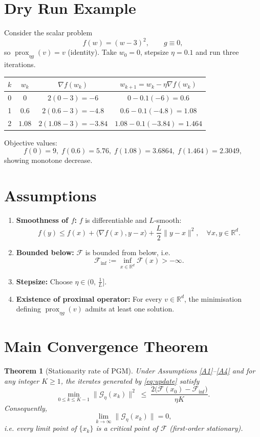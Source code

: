 \documentclass{article}
\newtheorem{theorem}{Theorem}
\newcommand{\prox}{\operatorname{prox}}
\newcommand{\grad}{\nabla}
\newcommand{\R}{\mathbb{R}}
\newcommand{\G}{\mathcal{G}}
\newcommand{\F}{\mathcal{F}}
\begin{document}
\section*{Dry Run Example}
Consider the scalar problem  
\[
f(w)=(w-3)^{2},\qquad g\equiv0,
\]
so $\prox_{\eta g}(v)=v$ (identity).  
Take $w_{0}=0$, stepsize $\eta=0.1$ and run three iterations.

\begin{center}
\begin{tabular}{c|c|c|c}
$k$ & $w_{k}$ & $\grad f(w_{k})$ & $w_{k+1}=w_{k}-\eta\grad f(w_{k})$ \\ \hline
0 & $0$ & $2(0-3)=-6$ & $0-0.1(-6)=0.6$ \\
1 & $0.6$ & $2(0.6-3)=-4.8$ & $0.6-0.1(-4.8)=1.08$ \\
2 & $1.08$ & $2(1.08-3)=-3.84$ & $1.08-0.1(-3.84)=1.464$ \\
\end{tabular}
\end{center}

Objective values:
\[
f(0)=9,\; f(0.6)=5.76,\; f(1.08)=3.6864,\; f(1.464)=2.3049,
\]
showing monotone decrease.

\newpage
\section*{Assumptions}
\begin{enumerate}[label=(A\arabic*)]
  \item \label{A1} \textbf{Smoothness of $f$:} $f$ is differentiable and $L$‑smooth:
  \[
  f(y)\le f(x)+\langle\grad f(x),y-x\rangle+\frac{L}{2}\|y-x\|^{2},
  \quad\forall x,y\in\R^{d}.
  \]
  \item \label{A2} \textbf{Bounded below:} $\F$ is bounded from below, i.e.
        \[
        \F_{\inf}:=\inf_{x\in\R^{d}}\F(x)>-\infty .
        \]
  \item \label{A3} \textbf{Stepsize:} Choose $\eta\in\bigl(0,\,\frac{1}{L}\bigr]$.
  \item \label{A4} \textbf{Existence of proximal operator:} For every $v\in\R^{d}$,
        the minimisation defining $\prox_{\eta g}(v)$ admits at least one solution.
\end{enumerate}

\section*{Main Convergence Theorem}
\begin{theorem}[Stationarity rate of PGM]\label{thm:main}
Under Assumptions \ref{A1}–\ref{A4} and for any integer $K\ge1$, the iterates generated by \eqref{eq:update} satisfy
\begin{equation}
\min_{0\le k\le K-1}\bigl\|\G_{\eta}(x_{k})\bigr\|^{2}
\;\le\;
\frac{2\bigl(\F(x_{0})-\F_{\inf}\bigr)}{\eta K}.
\label{eq:rate}
\end{equation}
Consequently,
\[
\lim_{k\to\infty}\bigl\|\G_{\eta}(x_{k})\bigr\|=0,
\]
i.e. every limit point of $\{x_{k}\}$ is a \emph{critical point} of $\F$ (first‑order stationary).
\end{theorem}
\end{document}
